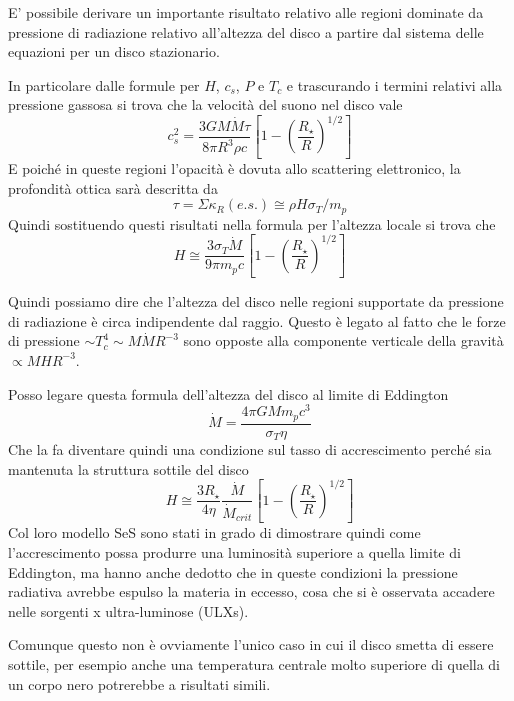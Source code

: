 \documentclass[a4paperbi]{article}
\begin{document}
	E' possibile derivare un importante risultato relativo alle regioni dominate da pressione di radiazione relativo all'altezza del disco a partire dal sistema delle equazioni per un disco stazionario.
	
	In particolare dalle formule per $H$, $c_s$, $P$ e $T_c$ e trascurando i termini relativi alla pressione gassosa si trova che la velocità del suono nel disco vale
	\begin{equation*}
		c_s^2=\frac{3GM\dot{M}\tau}{8\pi R^3\rho c}\left[1-\left(\frac{R_{\star}}{R}\right)^{1/2}\right]
	\end{equation*}
	E poiché in queste regioni l'opacità è dovuta allo scattering elettronico, la profondità ottica sarà descritta da
	\begin{equation*}
		\tau=\Sigma\kappa_R(e.s.)\cong\rho H\sigma_T/m_p
	\end{equation*}
	Quindi sostituendo questi risultati nella formula per l'altezza locale si trova che
	\begin{equation}
		H\cong\frac{3\sigma_T\dot{M}}{9\pi m_pc}\left[1-\left(\frac{R_{\star}}{R}\right)^{1/2}\right]
	\end{equation}
		 
	Quindi possiamo dire che l'altezza del disco nelle regioni supportate da pressione di radiazione è circa indipendente dal raggio. Questo è legato al fatto che le forze di pressione $\sim T_c^4\sim M\dot{M}R^{-3}$ sono opposte alla componente verticale della gravità $\propto MHR^{-3}$.
	
	Posso legare questa formula dell'altezza del disco al limite di Eddington
	\begin{equation*}
		\dot{M}=\frac{4\pi GMm_pc^3}{\sigma_T \eta}
	\end{equation*}
	Che la fa diventare quindi una condizione sul tasso di accrescimento perché sia mantenuta la struttura sottile del disco
	\begin{equation}
		H\cong\frac{3R_{\star}}{4\eta}\frac{\dot{M}}{\dot{M}_{crit}}\left[1-\left(\frac{R_{\star}}{R}\right)^{1/2}\right]
	\end{equation}
	Col loro modello SeS sono stati in grado di dimostrare quindi come l'accrescimento possa produrre una luminosità superiore a quella limite di Eddington, ma hanno anche dedotto che in queste condizioni la pressione radiativa avrebbe espulso la materia in eccesso, cosa che si è osservata accadere  nelle sorgenti x ultra-luminose (ULXs).
	
	Comunque questo non è ovviamente l'unico caso in cui il disco smetta di essere sottile, per esempio anche una temperatura centrale molto superiore di quella di un corpo nero potrerebbe a risultati simili.
	
\end{document}
